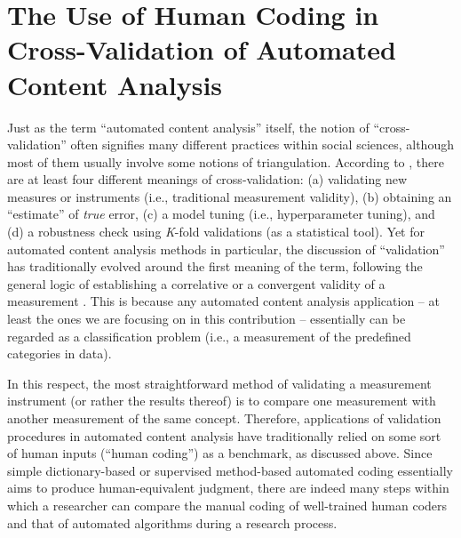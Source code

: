 \documentclass[man, 12pt, a4paper, nolmodern, noextraspace]{apa6}
\begin{document}
\section{The Use of Human Coding in Cross-Validation of Automated Content Analysis}
    
    Just as the term \enquote{automated content analysis} itself, the notion of \enquote{cross-validation} often signifies many different practices within social sciences, although most of them usually involve some notions of triangulation. According to \textcite{Neunhoeffer2018}, there are at least four different meanings of cross-validation: (a) validating new measures or instruments (i.e., traditional measurement validity), (b) obtaining an \enquote{estimate} of \textit{true} error, (c) a model tuning (i.e., hyperparameter tuning), and (d) a robustness check using \textit{K}-fold validations (as a statistical tool). Yet for automated content analysis methods in particular, the discussion of \enquote{validation} has traditionally evolved around the first meaning of the term, following the general logic of establishing a correlative or a convergent validity of a measurement \parencites[][]{Krippendorff2008validity}. This is because any automated content analysis application -- at least the ones we are focusing on in this contribution -- essentially can be regarded as a classification problem (i.e., a measurement of the predefined categories in data). 
    
    In this respect, the most straightforward method of validating a measurement instrument (or rather the results thereof) is to compare one measurement with another measurement of the same concept. Therefore, applications of validation procedures in automated content analysis have traditionally relied on some sort of human inputs (“human coding”) as a benchmark, as discussed above. Since simple dictionary-based or supervised method-based automated coding essentially aims to produce human-equivalent judgment, there are indeed many steps within which a researcher can compare the manual coding of well-trained human coders and that of automated algorithms during a research process.
    
\end{document}
